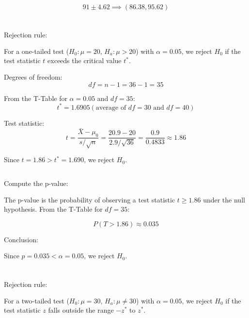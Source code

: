 \documentclass{homework}
\begin{document}
\[
91 \pm 4.62 \implies (86.38, 95.62)
\]

\section{}

\subsection{}

Rejection rule:

For a one-tailed test (\( H_0: \mu = 20 \), \( H_a: \mu > 20 \)) with \( \alpha = 0.05 \), we reject \( H_0 \) if the test statistic \( t \) exceeds the critical value \( t^* \).

Degrees of freedom:
\[
df = n - 1 = 36 - 1 = 35
\]

From the T-Table for \( \alpha = 0.05 \) and \( df = 35 \):
\[
t^* = 1.6905 (\text{average of } df = 30 \text{ and } df = 40)
\]

Test statistic:
\[
t = \frac{\bar{X} - \mu_0}{s / \sqrt{n}} = \frac{20.9 - 20}{2.9 / \sqrt{36}} = \frac{0.9}{0.4833} \approx 1.86
\]

Since \( t = 1.86 > t^* = 1.690 \), we reject \( H_0 \).

\subsection{}

Compute the p-value:

The p-value is the probability of observing a test statistic \( t \geq 1.86 \) under the null hypothesis. From the T-Table for \( df = 35 \):

\[
P(T > 1.86) \approx 0.035
\]

Conclusion:

Since \( p = 0.035 < \alpha = 0.05 \), we reject \( H_0 \).

\section{}

\subsection{}

Rejection rule:

For a two-tailed test (\( H_0: \mu = 30 \), \( H_a: \mu \neq 30 \)) with \( \alpha = 0.05 \), we reject \( H_0 \) if the test statistic \( z \) falls outside the range \( -z^* \) to \( z^* \).
\end{document}
